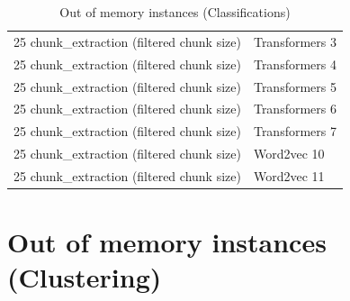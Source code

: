 \begin{table}[ht]
\begin{tabular}{ll}
25 chunk\_extraction (filtered chunk size) & Transformers 3 \\ 
25 chunk\_extraction (filtered chunk size) & Transformers 4 \\ 
25 chunk\_extraction (filtered chunk size) & Transformers 5 \\ 
25 chunk\_extraction (filtered chunk size) & Transformers 6 \\ 
25 chunk\_extraction (filtered chunk size) & Transformers 7 \\ 
25 chunk\_extraction (filtered chunk size) & Word2vec 10 \\ 
25 chunk\_extraction (filtered chunk size) & Word2vec 11 \\ 
\hline
\end{tabular}
\caption{Out of memory instances (Classifications)}
\label{tab:annexe:out_of_memory_instances_classifications}
\end{table}

\section{Out of memory instances (Clustering)}

\label{sec:annexe:out_of_memory_instances_clustering}

